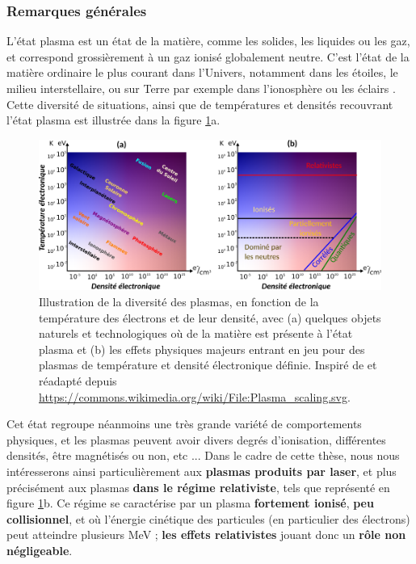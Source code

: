 \begin{refsection}
\subsubsection{Remarques générales}

L'état plasma est un état de la matière, comme les solides, les liquides ou les gaz, et correspond grossièrement à un gaz ionisé globalement neutre. C'est l'état de la matière ordinaire le plus courant dans l'Univers, notamment dans les étoiles, le milieu interstellaire, ou sur Terre par exemple dans l'ionosphère ou les éclairs \parencite{rax_2007}. Cette diversité de situations, ainsi que de températures et densités recouvrant l'état plasma est illustrée dans la figure \ref{fig:2-diversite_plasma}a.

\begin{figure}[hbtp]
    \centering
    \includegraphics[width=\linewidth]{2-laser/regimes_plasma.png}
    \caption{Illustration de la diversité des plasmas, en fonction de la température des électrons et de leur densité, avec (a) quelques objets naturels et technologiques où de la matière est présente à l'état plasma et (b) les effets physiques majeurs entrant en jeu pour des plasmas de température et densité électronique définie. Inspiré de \parencite{nap_2007} et réadapté depuis \url{https://commons.wikimedia.org/wiki/File:Plasma_scaling.svg}.}
    \label{fig:2-diversite_plasma}
\end{figure}

Cet état regroupe néanmoins une très grande variété de comportements physiques, et les plasmas peuvent avoir divers degrés d'ionisation, différentes densités, être magnétisés ou non, etc ... Dans le cadre de cette thèse, nous nous intéresserons ainsi particulièrement aux \textbf{plasmas produits par laser}, et plus précisément aux plasmas \textbf{dans le régime relativiste}, tels que représenté en figure \ref{fig:2-diversite_plasma}b. Ce régime se caractérise par un plasma \textbf{fortement ionisé}, \textbf{peu collisionnel}, et où l'énergie cinétique des particules (en particulier des électrons) peut atteindre plusieurs MeV ; \textbf{les effets relativistes} jouant donc un \textbf{rôle non négligeable}.


\end{refsection}
